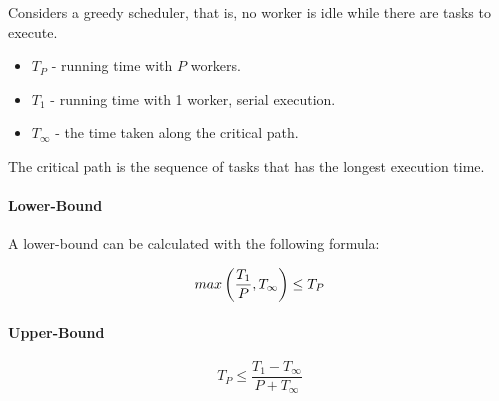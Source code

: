 Considers a greedy scheduler, that is,
no worker is idle while there are tasks to execute.

\begin{itemize}
    \item $T_P$ - running time with $P$ workers.
    \item $T_1$ - running time with 1 worker, serial execution.
    \item $T_\infty$ - the time taken along the critical path.
\end{itemize}

The critical path is the sequence of tasks that has the longest execution time.

\paragraph{Lower-Bound}
A lower-bound can be calculated with the following formula:

\begin{equation}
    \mathnormal{max}\left(\frac{T_1}{P}, T_\infty\right) \le T_P
\end{equation}

\paragraph{Upper-Bound}

\begin{equation}
    T_P \le \frac{T_1 - T_\infty}{P + T_\infty}
\end{equation}